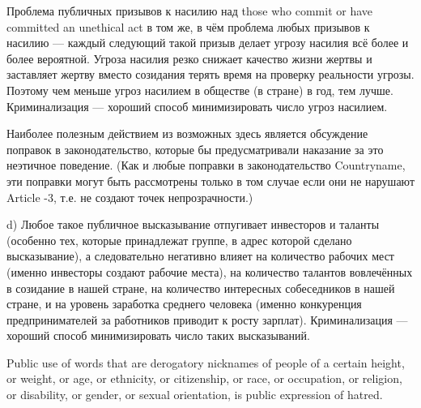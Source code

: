 \documentclass[11pt]{article}
\theoremstyle{remark}
\theoremstyle{definition}
\begin{document}
Проблема публичных призывов к насилию над those who commit or have committed an unethical act в том же, в чём проблема любых призывов к насилию --- каждый следующий такой призыв делает угрозу насилия всё более и более вероятной. Угроза насилия резко снижает качество жизни жертвы и заставляет жертву вместо созидания терять время на проверку реальности угрозы. Поэтому чем меньше угроз насилием в обществе (в стране) в год, тем лучше. Криминализация --- хороший способ минимизировать число угроз насилием.


Наиболее полезным действием из возможных здесь является обсуждение поправок в законодательство, которые бы предусматривали наказание за это неэтичное поведение. (Как и любые поправки в законодательство Countryname, эти поправки могут быть рассмотрены только в том случае если они не нарушают Article -3, т.е. не создают точек непрозрачности.) 








 






d) Любое такое публичное высказывание отпугивает инвесторов и таланты (особенно тех, которые принадлежат группе, в адрес которой сделано высказывание), а следовательно негативно влияет на количество рабочих мест (именно инвесторы создают рабочие места), на количество талантов вовлечённых в созидание в нашей стране, на количество интересных собеседников в нашей стране, и на уровень заработка среднего человека (именно конкуренция предпринимателей за работников приводит к росту зарплат). Криминализация --- хороший способ минимизировать число таких высказываний.



Public use of words that are derogatory nicknames of people of a certain height, or weight, or age, or ethnicity, or citizenship, or race, or occupation, or religion, or disability, or gender, or sexual orientation, is public expression of hatred.
\end{document}
